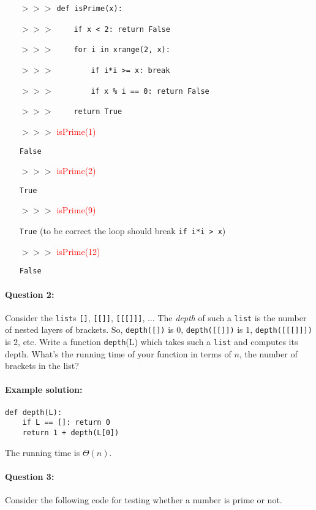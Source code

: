 \documentclass[11pt]{article}
\newcommand{\ans}[1]{\textcolor{red}{#1}}
\begin{document}
\begin{itemize}
\item[$>>>$] \texttt{def isPrime(x):}
\item[$>>>$] \ \ \ \ \texttt{if x < 2: return False}
\item[$>>>$] \ \ \ \ \texttt{for i in xrange(2, x):}
\item[$>>>$] \ \ \ \ \ \ \ \ \texttt{if i*i >= x: break}
\item[$>>>$] \ \ \ \ \ \ \ \ \texttt{if x \% i == 0: return False}
\item[$>>>$] \ \ \ \ \texttt{return True}
\item[$>>>$]\ans{isPrime(1)}
\item[] \texttt{False}
\item[$>>>$]\ans{isPrime(2)}
\item[] \texttt{True}
\item[$>>>$]\ans{isPrime(9)}
\item[] \texttt{True} (to be correct the loop should break \texttt{if
    i*i > x})
\item[$>>>$]\ans{isPrime(12)}
\item[] \texttt{False}
\end{itemize}

\paragraph{Question 2:}
Consider the \texttt{list}s \texttt{[]}, \texttt{[[]]},
\texttt{[[[]]]}, $\ldots$  The {\em depth} of such a \texttt{list} is
the
number of nested layers of brackets.  So, \texttt{depth([])} is $0$,
\texttt{depth([[]])} is $1$, \texttt{depth([[[]]])} is $2$, etc.
Write a function \texttt{depth}(L) which takes such a \texttt{list}
and computes its depth.  What's the running time of your function in
terms of $n$, the number of brackets in the list?

\paragraph{Example solution:}
\begin{verbatim}
def depth(L):
    if L == []: return 0
    return 1 + depth(L[0])
\end{verbatim}

The running time is $\Theta(n)$.

\paragraph{Question 3:}
Consider the following code for testing whether a number is prime or
not.
\end{document}
